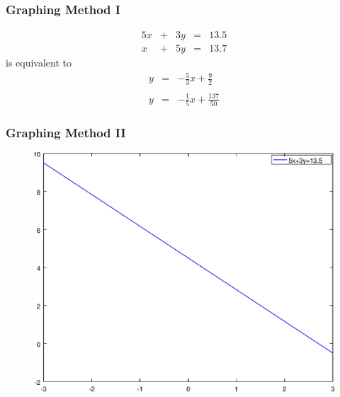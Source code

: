 \documentclass[xcolor=dvipsnames]{beamer}
\begin{document}
\begin{frame}
  \frametitle{Graphing Method I}
  \begin{equation}
    \label{eq:oamaiwei}
    \begin{array}{rcrcl}
      5x&+&3y&=&13.5 \\
      x&+&5y&=&13.7
    \end{array}
  \end{equation}
is equivalent to
  \begin{equation}
    \label{eq:kaiquaeb}
    \begin{array}{rcl}
      y&=&-\frac{5}{3}x+\frac{9}{2} \\
      && \\
      y&=&-\frac{1}{5}x+\frac{137}{50}
    \end{array}
  \end{equation}
\end{frame}

\begin{frame}
  \frametitle{Graphing Method II}
  \begin{figure}[h]
    \includegraphics[scale=.6]{./diagrams/gm-03-SystemsEquations-01.eps}
  \end{figure}
\end{frame}
\end{document}
